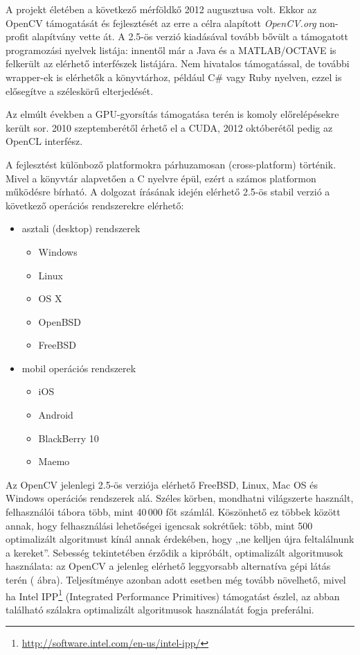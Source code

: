 A projekt életében a következő mérföldkő 2012 augusztusa volt. Ekkor az OpenCV támogatását és fejlesztését az erre a célra alapított \emph{OpenCV.org} non-profit alapítvány vette át. A 2.5-ös verzió kiadásával tovább bővült a támogatott programozási nyelvek listája: innentől már a Java és a MATLAB/OCTAVE is felkerült az elérhető interfészek listájára. Nem hivatalos támogatással, de további wrapper-ek is elérhetők a könyvtárhoz, például C\# vagy Ruby nyelven, ezzel is elősegítve a széleskörű elterjedését. 

Az elmúlt években a GPU-gyorsítás támogatása terén is komoly előrelépésekre került sor. 2010 szeptemberétől érhető el a CUDA, 2012 októberétől pedig az OpenCL interfész.

\bigskip

A fejlesztést különboző platformokra párhuzamosan (cross-platform) történik. Mivel a könyvtár alapvetően a C nyelvre épül, ezért a számos platformon működésre bírható. A dolgozat írásának idején elérhető 2.5-ös stabil verzió a következő operációs rendszerekre elérhető:

\begin{itemize}
  \item asztali (desktop) rendszerek
  \begin{itemize}
    \item Windows
    \item Linux
    \item OS X
    \item OpenBSD
    \item FreeBSD  
  \end{itemize}
  \item mobil operációs rendszerek
  \begin{itemize}
    \item iOS
    \item Android
    \item BlackBerry 10
    \item Maemo
  \end{itemize}   
\end{itemize}

\bigskip

Az OpenCV jelenlegi 2.5-ös verziója elérhető FreeBSD, Linux, Mac OS és Windows operációs rendszerek alá. Széles körben, mondhatni világszerte használt, felhasználói tábora több, mint 40\,000 főt számlál. Köszönhető ez többek között annak, hogy felhasználási lehetőségei igencsak sokrétűek: több, mint 500 optimalizált algoritmust kínál annak érdekében, hogy ,,ne kelljen újra feltalálnunk a kereket''. Sebesség tekintetében érződik a kipróbált, optimalizált algoritmusok használata: az OpenCV a jelenleg elérhető leggyorsabb alternatíva gépi látás terén ( ábra). Teljesítménye azonban adott esetben még tovább növelhető, mivel ha Intel IPP\footnote{\url{http://software.intel.com/en-us/intel-ipp/}} (Integrated Performance Primitives) támogatást észlel, az abban található szálakra optimalizált algoritmusok használatát fogja preferálni.

